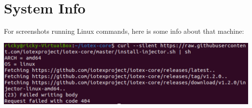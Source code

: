 \documentclass[
]{book}
\begin{document}
\hypertarget{system-info}{%
\chapter{System Info}\label{system-info}}

For screenshots running Linux commands, here is some info about that
machine:

\includegraphics{images/linux_info.PNG}

\backmatter
\end{document}

